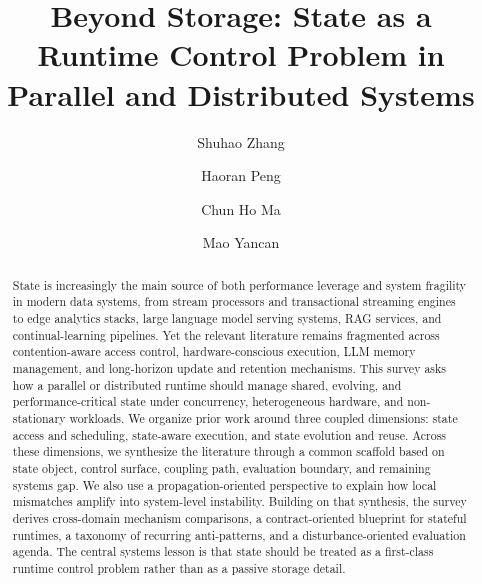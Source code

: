 \documentclass[acmsmall,screen,review]{acmart}
\begin{document}
\title{Beyond Storage: State as a Runtime Control Problem in Parallel and Distributed Systems}

\author{Shuhao Zhang}

\author{Haoran Peng}

\author{Chun Ho Ma}

\author{Mao Yancan}

\begin{abstract}
State is increasingly the main source of both performance leverage and system fragility in modern data systems, from stream processors and transactional streaming engines to edge analytics stacks, large language model serving systems, RAG services, and continual-learning pipelines. Yet the relevant literature remains fragmented across contention-aware access control, hardware-conscious execution, LLM memory management, and long-horizon update and retention mechanisms. This survey asks how a parallel or distributed runtime should manage shared, evolving, and performance-critical state under concurrency, heterogeneous hardware, and non-stationary workloads. We organize prior work around three coupled dimensions: state access and scheduling, state-aware execution, and state evolution and reuse. Across these dimensions, we synthesize the literature through a common scaffold based on state object, control surface, coupling path, evaluation boundary, and remaining systems gap. We also use a propagation-oriented perspective to explain how local mismatches amplify into system-level instability. Building on that synthesis, the survey derives cross-domain mechanism comparisons, a contract-oriented blueprint for stateful runtimes, a taxonomy of recurring anti-patterns, and a disturbance-oriented evaluation agenda. The central systems lesson is that state should be treated as a first-class runtime control problem rather than as a passive storage detail.
\end{abstract}

\end{document}
